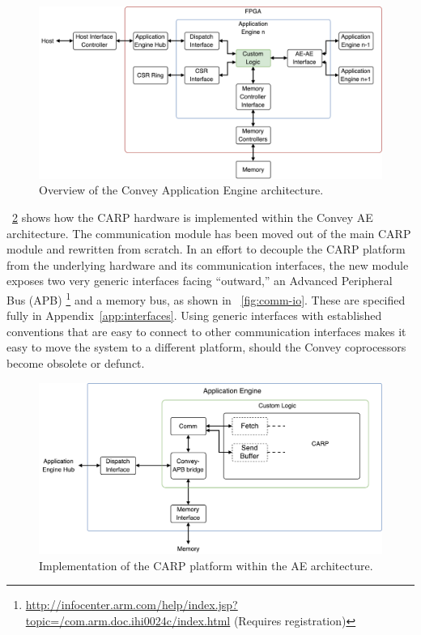 \begin{figure}[ht]
  \centering
  \includegraphics[width=\linewidth]{fig/convey-ae-io-overview}
  \caption[Convey Application Engine architecture]{Overview of the Convey Application Engine architecture.}
  \label{fig:convey-ae-io-overview}
\end{figure}

\figurename~\ref{fig:convey-io-carp-overivew} shows how the CARP hardware is
implemented within the Convey AE architecture. The communication module has been
moved out of the main CARP module and rewritten from scratch. In an effort to
decouple the CARP platform from the underlying hardware and its communication
interfaces, the new module exposes two very generic interfaces facing
``outward,'' an Advanced Peripheral Bus (APB)
\footnote{\url{http://infocenter.arm.com/help/index.jsp?topic=/com.arm.doc.ihi0024c/index.html}
(Requires registration)} and a memory bus, as shown in
\figurename~\ref{fig:comm-io}. These are specified fully in
Appendix~\ref{app:interfaces}. Using generic interfaces with established
conventions that are easy to connect to other communication interfaces makes it
easy to move the system to a different platform, should the Convey coprocessors
become obsolete or defunct.

\begin{figure}[ht]
  \centering
  \includegraphics[width=\linewidth]{fig/convey-io-carp-overview}
  \caption[CARP platform implemented in the AE architecture]{Implementation of the CARP platform within the AE architecture.}
  \label{fig:convey-io-carp-overivew}
\end{figure}

